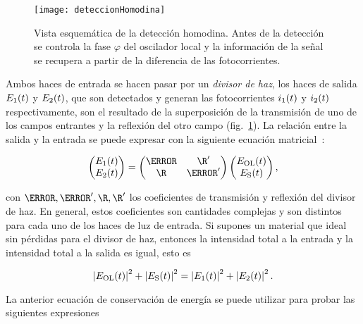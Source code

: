 \begin{figure}[H]
\centering
\begin{minipage}{0.8\textwidth}
\centering
\texttt{[image: deteccionHomodina]}
\caption{\label{fig:deteccionHomodina}Vista esquemática de la detección homodina. Antes de la detección se controla la fase $\varphi$ del oscilador local y la información de la señal se recupera a partir de la diferencia de las fotocorrientes.}
\end{minipage}
\end{figure}

Ambos haces de entrada se hacen pasar por un \emph{divisor de haz}, los haces de salida $E_{1}(t)$ y $E_{2}(t)$, que son detectados y generan las fotocorrientes $i_{1}(t)$ y $i_{2}(t)$ respectivamente, son el resultado de la superposición de la transmisión de uno de los campos entrantes y la reflexión del otro campo (fig.~\ref{fig:deteccionHomodina}). La relación entre la salida y la entrada se puede expresar con la siguiente ecuación matricial~\cite{saleh}:

\begin{equation}
\label{ec:divisorHaz}
\begin{pmatrix}
E_\sm{1}(t)\\
E_\sm{2}(t)
\end{pmatrix}
=
\begin{pmatrix}
\T & \R'\\
\R & \T' 
\end{pmatrix}
\begin{pmatrix}
E_\sm{\mathrm{OL}}(t)\\
E_\sm{\mathrm{S}}(t)
\end{pmatrix},
\end{equation}

con $\T, \T', \R, \R'$ los coeficientes de transmisión y reflexión del divisor de haz. En general, estos coeficientes son cantidades complejas y son distintos para cada uno de los haces de luz de entrada. Si supones un material que ideal sin pérdidas para el divisor de haz, entonces la intensidad total a la entrada y la intensidad total a la salida es igual, esto es

\begin{equation}
\label{ec:conservacionEnergia}
\left|E_{\mathrm{OL}}(t)\right|^{2}+\left|E_{\mathrm{S}}(t)\right|^{2}=\left|E_{1}(t)\right|^{2}+\left|E_{2}(t)\right|^{2}.
\end{equation}

La anterior ecuación de conservación de energía se puede utilizar para probar las siguientes expresiones

